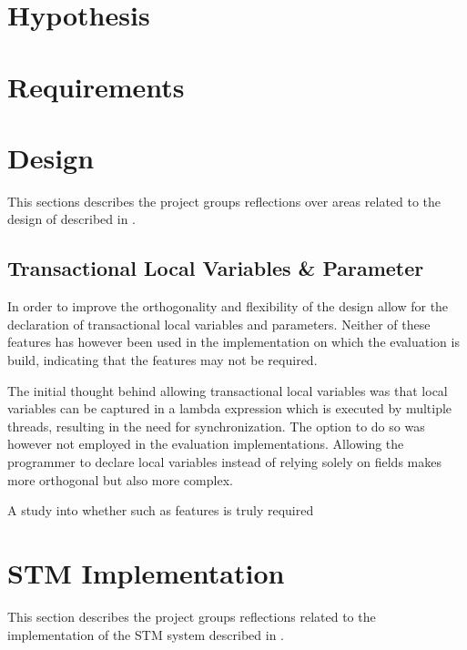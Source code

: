 \section{Hypothesis}
\section{Requirements}
\section{Design}
This sections describes the project groups reflections over areas related to the design of \stmname described in . 

\subsection{Transactional Local Variables \& Parameter}
In order to improve the orthogonality and flexibility of \stmname the design allow for the declaration of transactional local variables and parameters. Neither of these features has however been used in the implementation on which the evaluation is build, indicating that the features may not be required. 

The initial thought behind allowing transactional local variables was that local variables can be captured in a lambda expression which is executed by multiple threads, resulting in the need for synchronization. The option to do so was however not employed in the evaluation implementations. Allowing the programmer to declare  local variables instead of relying solely on  fields makes \stmnamesp more orthogonal but also more complex.



A study into whether such as features is truly required 


\section{STM Implementation}
This section describes the project groups reflections related to the implementation of the \ac{STM} system described in .

